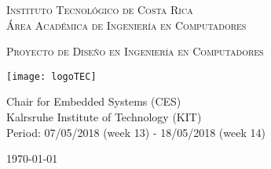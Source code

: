 
\thispagestyle{empty} 

\begin{center}

\textsc{\LARGE Instituto Tecnol\'ogico de Costa Rica} \\
\textsc{\Large \'Area Acad\'emica de Ingenier\'ia en Computadores}

\textsc{\Large Proyecto de Dise\~no en Ingenier\'ia en Computadores}


\par\vspace{20mm}

\texttt{[image: logoTEC]}

\par\vspace*{\fill}

{\LARGE\bf{\textsf{ \Huge \scriptTitle}}}

\par\vspace*{\fill}

Chair for Embedded Systems (CES) \\
Kalrsruhe Institute of Technology (KIT) \\
Period: 07/05/2018 (week 13) - 18/05/2018 (week 14) 

\par\vspace{20mm}

\textsc{\Large \scriptAuthor}

\vspace*{\fill}

{\today}

\end{center}
\newpage 
\cleardoublepage  

